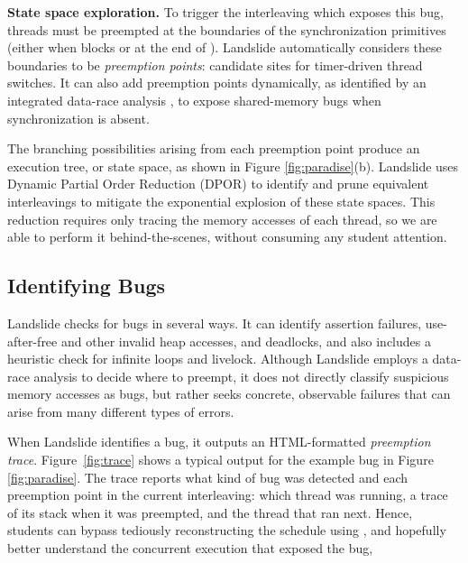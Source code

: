 {\bf State space exploration.}
To trigger the interleaving which exposes this bug, threads must be preempted at the boundaries of the synchronization primitives (either when  blocks or at the end of ).
Landslide automatically considers these boundaries to be {\em preemption points}: candidate sites for timer-driven thread switches.
It can also add preemption points dynamically,
as identified by an integrated data-race analysis \cite{hybriddatarace,fasttrack},
to expose shared-memory bugs when synchronization is absent.

The branching possibilities arising from each preemption point produce an execution tree, or state space,
as shown in Figure \ref{fig:paradise}(b).
Landslide uses Dynamic Partial Order Reduction (DPOR) \cite{dpor} to identify and prune equivalent interleavings
to mitigate the exponential explosion of these state spaces.
This reduction requires only tracing the memory accesses of each thread,
so we are able to perform it behind-the-scenes, without consuming any student attention.

\subsection{Identifying Bugs}

Landslide checks for bugs in several ways.
It can identify assertion failures, use-after-free and other invalid heap accesses, and
deadlocks, and also includes a heuristic check for infinite loops and livelock.
Although Landslide employs a data-race analysis to decide where to preempt,
it does not directly classify suspicious memory accesses as bugs,
but rather seeks concrete, observable failures that can arise from many different types of errors.

When Landslide identifies a bug, it outputs an HTML-formatted
{\em preemption trace}.
Figure~\ref{fig:trace} shows a typical output for the example bug in Figure \ref{fig:paradise}.
The trace reports what kind of bug was detected
and each preemption point in the current interleaving:
which thread was running, a trace of its stack when it was preempted, and the thread that ran next.
Hence, students can bypass tediously reconstructing the schedule using ,
and hopefully better understand the concurrent execution that exposed the bug,

